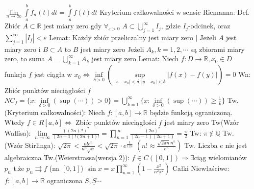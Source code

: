 \documentclass{article}
\begin{document}
$\lim\limits_{n\rightarrow\infty}\int\limits_{a}^{b}f_n(t)dt=\int\limits_{a}^{b}f(t)dt$\newline
Kryterium całkowalności w sensie Riemanna:\newline
Def. Zbiór $A\subset\mathbb{R}$ jest $\underline{\text{miary zero}}$ gdy 
$\forall_{\varepsilon>0}$ $A\subset\bigcup\limits_{j=1}^{\infty}I_j$, gdzie $I_j$-odcinek, oraz $\sum\limits_{j=1}^{\infty}|I_j|<\varepsilon$\newline
Lemat: Każdy zbiór przeliczalny jest miary zero $|$ Jeżeli $A$ jest miary zero i $B\subset A$ to $B$ jest miary zero\newline
Jeżeli $A_k,k=1,2,\cdots$ są zbiorami miary zero, to suma $A=\bigcup\limits_{k=1}^{\infty}A_k$ jest miary zero\newline
Lemat: Niech $f:D\rightarrow\mathbb{R}, x_0\in D$ funkcja $f$ jest ciągła w $x_0\Leftrightarrow
\inf\limits_{\delta>0}(\sup\limits_{|x-x_0|<\delta,|y-x_0|<\delta}|f(x)-f(y)|)=0$\newline
Wn: Zbiór punktów nieciągłości $f$ $NC_f=\{x:\inf\limits_{\delta>0}(\sup(\cdots))>0\}
=\bigcup\limits_{k=1}^{\infty}\{x:\inf\limits_{\delta>0}(\sup(\cdots))\ge\frac{1}{k}\}$\newline
Tw.(Kryterium całkowalności): Niech $f:[a,b]\rightarrow\mathbb{R}$ będzie funkcją ograniczoną.\newline
Wtedy $f\in R[a,b]\Leftrightarrow$ Zbiór punktów nieciągłości $f$ jest miary zero\newline
Tw(Wzór Wallisa): $\lim\limits_{n\rightarrow\infty}\frac{((2n)!!)^2}{(2n-1)!(2n+1)!}=\prod\limits_{n=1}^{\infty}\frac{(2n)^2}{(2n-1)(2n+1)}=\frac{\pi}{2}$\newline
Tw: $\pi\notin\mathbb{Q}$\newline
Tw.(Wzór Stirlinga): $\sqrt{2\pi}<\frac{n!e^n}{n^n\sqrt{n}}<\sqrt{2\pi}\cdot e^{\frac{1}{12n}}$ $(n!\approx\frac{\sqrt{2\pi n}n^n}{e^n})$\newline
Tw. Liczba $e$ nie jest algebraiczna\newline
Tw.(Weierstrassa(wersja 2)): $f\in C([0,1])\Rightarrow\exists$ciąg wielomianów $p_n$ t.że $p_n\rightrightarrows f$ (na $[0,1]$)\newline
$\sin{x}=x\prod\limits_{n=1}^{\infty}(1-\frac{x^2}{n^2\pi^2})$\newline\newline
Całki Niewłaściwe:\newline
$f:[a,b]\rightarrow\mathbb{R}$ ograniczona $\overline{S},\underline{S}\cdots$\newline
\end{document}

